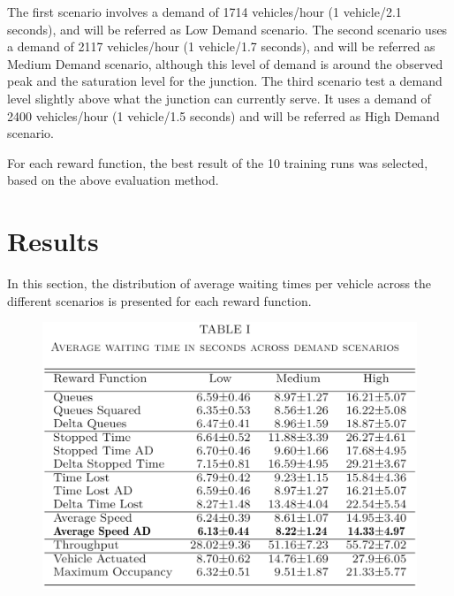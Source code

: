 \documentclass[conference]{IEEEtran}
\begin{document}
The first scenario involves a demand of 1714 vehicles/hour (1 vehicle/2.1 seconds), and will be referred as Low Demand scenario.
The second scenario uses a demand of 2117 vehicles/hour (1 vehicle/1.7 seconds), and will be referred as Medium Demand scenario, although this level of demand is around the observed peak and the saturation level for the junction.
The third scenario test a demand level slightly above what the junction can currently serve. It uses a demand of 2400 vehicles/hour (1 vehicle/1.5 seconds) and will be referred as High Demand scenario.

For each reward function, the best result of the 10 training runs was selected, based on the above evaluation method.

\section{Results}\label{results}
In this section, the distribution of average waiting times per vehicle across the different scenarios is presented for each reward function.

\begin{figure}[thpb]
    \centering
    \includegraphics[width=\linewidth]{figures/table.png}
    \label{fig:table}
\end{figure}
\end{document}
